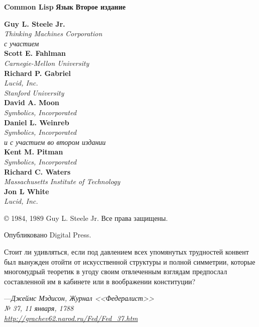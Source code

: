 \else

\begin{titlepage}

\noindent\textbf{Common Lisp}
\noindent\textbf{Язык}
\noindent\textbf{Второе издание}
\begin{flushleft}
\textbf{Guy L. Steele Jr.} \\
\emph{Thinking Machines Corporation} \\
\emph{с участием} \\
\textbf{Scott E. Fahlman} \\
\emph{Carnegie-Mellon University} \\
\textbf{Richard P. Gabriel} \\
\emph{Lucid, Inc.} \\
\emph{Stanford University} \\
\textbf{David A. Moon} \\
\emph{Symbolics, Incorporated} \\
\textbf{Daniel L. Weinreb} \\
\emph{Symbolics, Incorporated} \\
\emph{и с участием во втором издании} \\
\textbf{Kent M. Pitman} \\
\emph{Symbolics, Incorporated} \\
\textbf{Richard C. Waters} \\
\emph{Massachusetts Institute of Technology} \\
\textbf{Jon L White} \\
\emph{Lucid, Inc.}
\end{flushleft}

\begin{center}
\copyright{} 1984, 1989 Guy L. Steele Jr. Все права защищены.
\end{center}
\begin{flushright}
Опубликовано Digital Press.
\end{flushright}

\end{titlepage}

\newpage 

Стоит ли удивляться, если под давлением всех упомянутых трудностей конвент был
вынужден отойти от искусственной структуры и полной симметрии, которые
многомудрый теоретик в угоду своим отвлеченным взглядам предпослал составленной
им в кабинете или в воображении конституции?
\begin{tabbing}
---\=\emph{Джеймс Мэдисон, Журнал <<Федералист>>} \\
\>\emph{№ 37, 11 января, 1788} \\
\>\emph{\href{http://grachev62.narod.ru/Fed/Fed\_37.htm}{http://grachev62.narod.ru/Fed/Fed\_37.htm}}
\end{tabbing}

\fi
